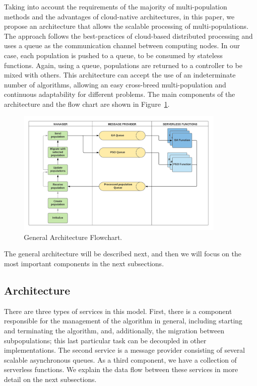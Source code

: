 \documentclass[runningheads]{llncs}
\begin{document}
Taking into account the requirements of the majority of 
multi-population methods and the advantages of cloud-native %
architectures, in this paper, we propose an architecture 
that allows the scalable processing of multi-populations. 
The approach follows the best-practices of cloud-based 
distributed processing and uses a queue as the communication 
channel between computing nodes. In our case,  
each population is pushed to a queue, to be consumed by stateless functions.
Again, using a queue, populations are returned to a controller to be mixed with others.
This architecture can accept the use of an
indeterminate number of algorithms, allowing an easy cross-breed
multi-population and continuous adaptability for different problems. 
The main components of the architecture and the flow chart are shown 
in Figure~\ref{flow}.


\begin{figure}[htp]
  \centering
  \includegraphics[width=0.9\textwidth]{img/architecture.png}
  \caption{General Architecture Flowchart.} \label{flow}
  \end{figure}

The general architecture will be described next, and then we will
focus on the most important components in the next subsections.

\subsection{Architecture}

There are three types of services in this model. First, there is a component
responsible for the management of the algorithm in general, including
starting and terminating the algorithm, and, additionally, the migration between subpopulations; this
last particular task can be decoupled in other implementations. The second service is
a message provider consisting of several scalable asynchronous queues. As a
third component, we have a collection of serverless functions. We explain the 
data flow between these services in more detail on the next subsections.  
\end{document}
